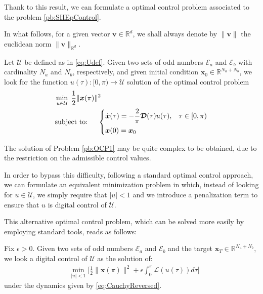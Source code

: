 Thank to this result, we can formulate a optimal control problem associated to the problem \ref{pb:SHEpControl}.

In what follows, for a given vector $\bm{v}\in\mathbb{R}^d$, we shall always denote by $\|\bm{v}\|$ the euclidean norm $\|\bm{v}\|_{\mathbb{R}^d}$.
\newline


\begin{problem}\label{pb:OCP1}
Let $\mathcal U$ be defined as in \eqref{eq:Udef}. Given two sets of odd numbers $\mathcal {E}_a $ and $\mathcal {E}_b $ with cardinality $N_a$ and $N_b$, respectively, and given initial condition $\bm{x}_0\in \mathbb{R}^{N_a+N_b}$, we look for the function $u(\tau):[0,\pi)\to \mathcal U$ solution of the optimal control problem  
\begin{align*}
	&\min_{u \in \mathcal{U}}\;\frac 12 \|\bm{x}(\pi)\|^2
	\\
    &\notag \text{subject to: }\quad \begin{cases}
            \displaystyle \dot{\bm{x}}(\tau) = -\frac 2\pi\bm{\mathcal{D}}(\tau) u(\tau),  & \tau \in [0,\pi)\\[6pt]
            \bm{x}(0) = \bm{x}_0
    \end{cases}
    \end{align*}
\end{problem}
The solution of Problem \ref{pb:OCP1} may be quite complex to be obtained, due to the restriction on the admissible control values. 

In order to bypass this difficulty, following a standard optimal control approach, we can formulate an equivalent minimization problem in which, instead of looking for $u\in\mathcal U$, we simply require that $|u|<1$ and we introduce a penalization term to ensure that $u$ is digital control of $\mathcal{U}$.


%
This alternative optimal control problem, which can be solved more easily by employing standard tools, reads as follows:
\newline
\begin{problem}\label{pb:OCP_penalizado}
Fix $\epsilon>0$. Given two sets of odd numbers $\mathcal E_a $ and $\mathcal E_b $ and the target $\bm{x}_T \in \mathbb {R}^{N_a + N_b}$, we look a digital control of $\mathcal{U}$ as the solution of:
\begin{align*}
	&\min_{|u|<1} \Bigg[\frac 12 \|\bm{x}(\pi) \|^2+ \epsilon \int_0^{\pi} \mathcal{L}(u(\tau)) d\tau \Bigg]  
\end{align*}
under the dynamics given by \eqref{eq:CauchyReversed}.
\end{problem}

